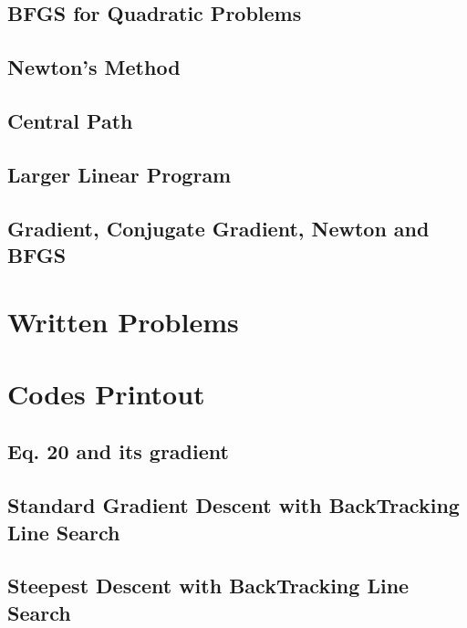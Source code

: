 \documentclass[11pt,a4paper]{article}
\begin{document}
\newpage
\subsection{BFGS for Quadratic Problems}

\newpage
\subsection{Newton’s Method}

\newpage
\subsection{Central Path}


\newpage
\subsection{Larger Linear Program}

\newpage
\subsection{Gradient, Conjugate Gradient, Newton and BFGS}

\newpage
\section{Written Problems}

\newpage
\appendix
\section{Codes Printout}

\subsection{Eq. 20 and its gradient}
%

\newpage
\subsection{Standard Gradient Descent with BackTracking Line Search}
%

\newpage
\subsection{Steepest Descent with BackTracking Line Search}
%
\end{document}
